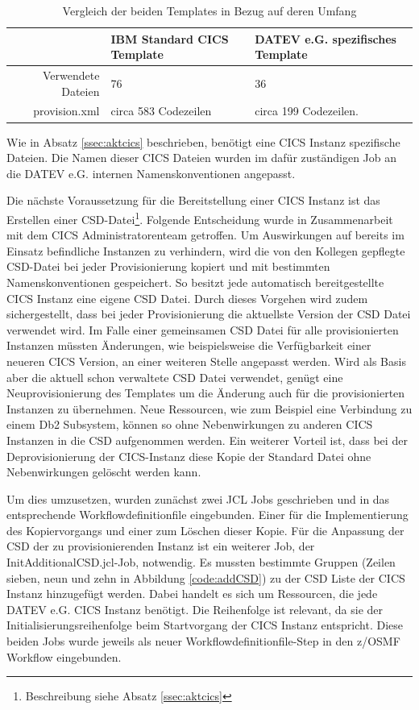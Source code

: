 \begin{table}[h]
\centering
\begin{tabularx}{\textwidth}{r|X|X}
& IBM Standard CICS Template & DATEV e.G. spezifisches Template \\
\hline
Verwendete Dateien & 76 & 36 \\
\hline
provision.xml & circa 583 Codezeilen & circa 199 Codezeilen. \\
\end{tabularx}
\caption{Vergleich der beiden Templates in Bezug auf deren Umfang}
\label{tab:vglTemps}
\end{table}

Wie in Absatz \ref{ssec:aktcics} beschrieben, benötigt eine CICS Instanz spezifische Dateien.
Die Namen dieser CICS Dateien wurden im dafür zuständigen Job an die DATEV e.G. internen Namenskonventionen angepasst.

Die nächste Voraussetzung für die Bereitstellung einer CICS Instanz ist das Erstellen einer CSD-Datei\footnote{Beschreibung siehe Absatz \ref{ssec:aktcics}}.
Folgende Entscheidung wurde in Zusammenarbeit mit dem CICS Administratorenteam getroffen.
Um Auswirkungen auf bereits im Einsatz befindliche Instanzen zu verhindern, wird die von den Kollegen gepflegte CSD-Datei bei jeder Provisionierung kopiert und mit bestimmten Namenskonventionen gespeichert.
So besitzt jede automatisch bereitgestellte CICS Instanz eine eigene CSD Datei.
Durch dieses Vorgehen wird zudem sichergestellt, dass bei jeder Provisionierung die aktuellste Version der CSD Datei verwendet wird.
Im Falle einer gemeinsamen CSD Datei für alle provisionierten Instanzen müssten Änderungen, wie beispielsweise die Verfügbarkeit einer neueren CICS Version, an einer weiteren Stelle angepasst werden.
Wird als Basis aber die aktuell schon verwaltete CSD Datei verwendet, genügt eine Neuprovisionierung des Templates um die Änderung auch für die provisionierten Instanzen zu übernehmen.
Neue Ressourcen, wie zum Beispiel eine Verbindung zu einem Db2 Subsystem, können so ohne Nebenwirkungen zu anderen CICS Instanzen in die CSD aufgenommen werden.
Ein weiterer Vorteil ist, dass bei der Deprovisionierung der CICS-Instanz diese Kopie der Standard Datei ohne Nebenwirkungen gelöscht werden kann.

Um dies umzusetzen, wurden zunächst zwei JCL Jobs geschrieben und in das entsprechende Workflowdefinitionfile eingebunden.
Einer für die Implementierung des Kopiervorgangs und einer zum Löschen dieser Kopie.
Für die Anpassung der CSD der zu provisionierenden Instanz ist ein weiterer Job, der \glqq InitAdditionalCSD.jcl\grqq-Job, notwendig.
Es mussten bestimmte Gruppen (Zeilen sieben, neun und zehn in Abbildung \ref{code:addCSD}) zu der CSD Liste der CICS Instanz hinzugefügt werden.
Dabei handelt es sich um Ressourcen, die jede DATEV e.G. CICS Instanz benötigt.
Die Reihenfolge ist relevant, da sie der Initialisierungsreihenfolge beim Startvorgang der CICS Instanz entspricht.
Diese beiden Jobs wurde jeweils als neuer Workflowdefinitionfile-Step in den z/OSMF Workflow eingebunden.

